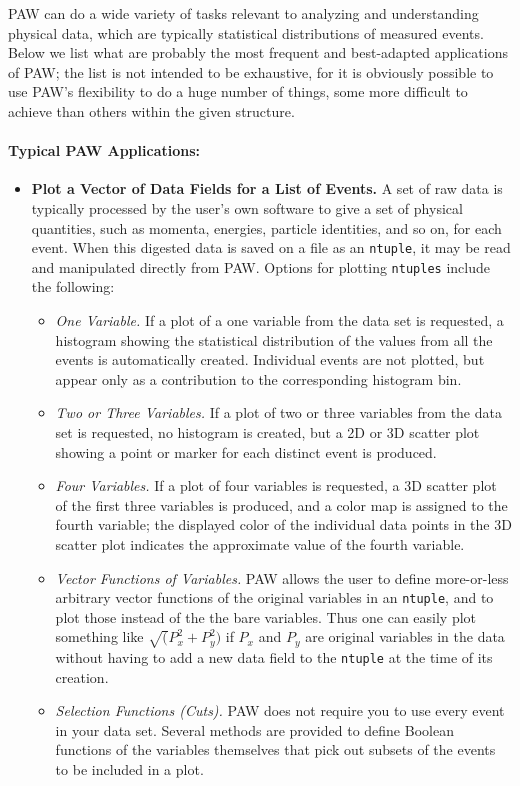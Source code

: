 PAW can do a wide variety of tasks relevant to analyzing and
understanding physical data, which are typically statistical
distributions of measured events.   Below we list what are
probably the most frequent and best-adapted applications of PAW;
the list is not intended to be exhaustive, for it is obviously
possible to use PAW's flexibility to do a huge number of things,
some more difficult to achieve than others within the given structure.
 
\paragraph{Typical PAW Applications:}
 
\begin{itemize}
\item {\bf Plot a Vector of Data Fields for a List of Events.}
A set of raw data is typically processed by the user's own software to
give a set of physical quantities, such as momenta, energies, particle
identities, and so on, for each event.  When this digested data is
saved on a file as an \verb|ntuple|, it may be read and manipulated
directly from PAW.  Options for plotting
\verb|ntuples| include the following:
 
\begin{itemize}
\item {\it One Variable.\/}  If a plot of a one variable
from the data set is requested, a histogram showing the statistical
distribution of the values from all the events is automatically
created.  Individual events are not plotted, but appear only as a
contribution to the corresponding histogram bin.
\item {\it Two or Three Variables.\/}  If a plot
of two or three variables from the data set is requested,
no histogram is created, but a 2D or 3D
scatter plot showing a point or marker for
each distinct event is produced.
\item {\it Four Variables.\/}  If a plot
of four variables is requested, a 3D scatter plot of the first three
variables is produced, and a color map is assigned to the fourth
variable; the displayed color of the individual data points in the 3D
scatter plot indicates the approximate value of the fourth variable.
\item {\it Vector Functions of Variables.\/}  PAW allows
the user to define more-or-less arbitrary vector functions of the
original variables in an \verb|ntuple|, and to plot those instead of
the the bare variables.  Thus one can easily plot something
like $\sqrt(P_{x}^{2} + P_{y}^{2})$ if $P_{x}$ and $P_{y}$ are
original variables in the data without having to add a new data
field to the \verb|ntuple| at the time of its creation.
\item {\it Selection Functions (Cuts).\/}  PAW does not require you
to use every event in your data set.  Several methods are provided
to define Boolean functions of the variables themselves
that pick out subsets of the events to be included in a plot.
\end{itemize}
 

\end{itemize}
